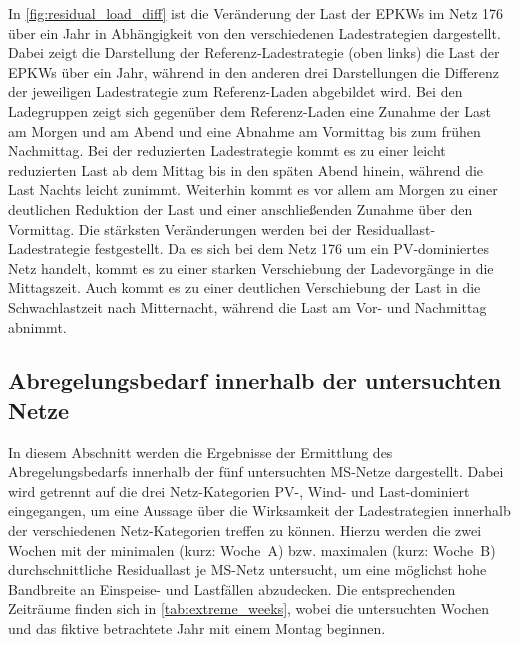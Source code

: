 

In \autoref{fig:residual_load_diff} ist die Veränderung der Last der \glspl{EPKW} im Netz \num{176} über ein Jahr in Abhängigkeit von den verschiedenen Ladestrategien dargestellt.
Dabei zeigt die Darstellung der Referenz-Ladestrategie (oben links) die Last der \glspl{EPKW} über ein Jahr, während in den anderen drei Darstellungen die Differenz der jeweiligen Ladestrategie zum Referenz-Laden abgebildet wird.
Bei den Ladegruppen zeigt sich gegenüber dem Referenz-Laden eine Zunahme der Last am Morgen und am Abend und eine Abnahme am Vormittag bis zum frühen Nachmittag.
Bei der reduzierten Ladestrategie kommt es zu einer leicht reduzierten Last ab dem Mittag bis in den späten Abend hinein, während die Last Nachts leicht zunimmt.
Weiterhin kommt es vor allem am Morgen zu einer deutlichen Reduktion der Last und einer anschließenden Zunahme über den Vormittag.
Die stärksten Veränderungen werden bei der Residuallast-Ladestrategie festgestellt.
Da es sich bei dem Netz \num{176} um ein \gls{PV}-dominiertes Netz handelt, kommt es zu einer starken Verschiebung der Ladevorgänge in die Mittagszeit.
Auch kommt es zu einer deutlichen Verschiebung der Last in die Schwachlastzeit nach Mitternacht, während die Last am Vor- und Nachmittag abnimmt.




\subsection{Abregelungsbedarf innerhalb der untersuchten Netze}\label{chap:cur_results}

In diesem Abschnitt werden die Ergebnisse der Ermittlung des Abregelungsbedarfs innerhalb der fünf untersuchten \gls{MS}-Netze dargestellt.
Dabei wird getrennt auf die drei Netz-Kategorien \gls{PV}-, Wind- und Last-dominiert eingegangen, um eine Aussage über die Wirksamkeit der Ladestrategien innerhalb der verschiedenen Netz-Kategorien treffen zu können.
Hierzu werden die zwei Wochen mit der minimalen (kurz: Woche~A) bzw. maximalen (kurz: Woche~B) durchschnittliche Residuallast je \gls{MS}-Netz untersucht, um eine möglichst hohe Bandbreite an Einspeise- und Lastfällen abzudecken.
Die entsprechenden Zeiträume finden sich in \autoref{tab:extreme_weeks}, wobei die untersuchten Wochen und das fiktive betrachtete Jahr mit einem Montag beginnen.



